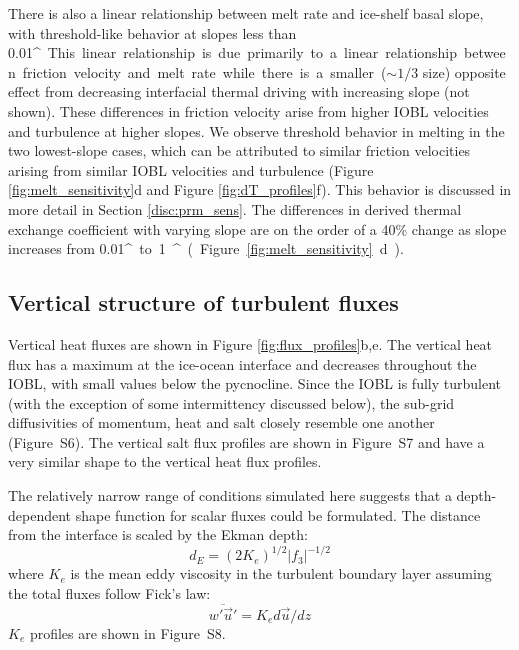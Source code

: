 \documentclass[tc, manuscript]{copernicus}
\begin{document}
There is also a linear relationship between melt rate and ice-shelf basal slope, with threshold-like behavior at slopes less than 0.01\unit{^{\circ}}. This linear relationship is due primarily to a linear relationship between friction velocity and melt rate while there is a smaller ($\sim\!1/3$ size) opposite effect from decreasing interfacial thermal driving with increasing slope (not shown). These differences in friction velocity arise from higher IOBL velocities and turbulence at higher slopes. We observe threshold behavior in melting in the two lowest-slope cases, which can be attributed to similar friction velocities arising from similar IOBL velocities and turbulence (Figure \ref{fig:melt_sensitivity}d and Figure \ref{fig:dT_profiles}f). This behavior is discussed in more detail in Section \ref{disc:prm_sens}. The differences in derived thermal exchange coefficient with varying slope are on the order of a 40\% change as slope increases from 0.01\unit{^{\circ}} to 1\unit{^{\circ}} (Figure \ref{fig:melt_sensitivity}d).  


\subsection{Vertical structure of turbulent fluxes}

Vertical heat fluxes are shown in Figure \ref{fig:flux_profiles}b,e. The vertical heat flux has a maximum at the ice-ocean interface and decreases throughout the IOBL, with small values below the pycnocline. Since the IOBL is fully turbulent (with the exception of some intermittency discussed below), the sub-grid diffusivities of momentum, heat and salt closely resemble one another (Figure~S6). The vertical salt flux profiles are shown in Figure~S7 and have a very similar shape to the vertical heat flux profiles.

The relatively narrow range of conditions simulated here suggests that a depth-dependent shape function for scalar fluxes could be formulated. The distance from the interface is scaled by the Ekman depth:
\begin{equation}
    d_E = (2 K_e)^{1/2} |f_3|^{-1/2}
\end{equation}
where $K_e$ is the mean eddy viscosity in the turbulent boundary layer assuming the total fluxes follow Fick's law:
\begin{equation}
    \overline{w'\vec{u}'} = K_e d\vec{u}/dz
\end{equation}
$K_e$ profiles are shown in Figure~S8. 
\end{document}

